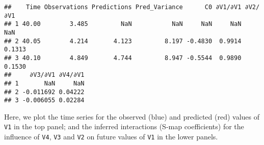 \documentclass[]{article}
\newenvironment{Shaded}{\begin{snugshade}}{\end{snugshade}}
\newcommand{\DataTypeTok}[1]{\textcolor[rgb]{0.13,0.29,0.53}{#1}}
\newcommand{\DecValTok}[1]{\textcolor[rgb]{0.00,0.00,0.81}{#1}}
\newcommand{\FloatTok}[1]{\textcolor[rgb]{0.00,0.00,0.81}{#1}}
\newcommand{\KeywordTok}[1]{\textcolor[rgb]{0.13,0.29,0.53}{\textbf{#1}}}
\newcommand{\NormalTok}[1]{#1}
\newcommand{\OperatorTok}[1]{\textcolor[rgb]{0.81,0.36,0.00}{\textbf{#1}}}
\newcommand{\StringTok}[1]{\textcolor[rgb]{0.31,0.60,0.02}{#1}}
\begin{document}
\begin{verbatim}
##    Time Observations Predictions Pred_Variance      C0 ∂V1/∂V1 ∂V2/∂V1
## 1 40.00        3.485         NaN           NaN     NaN     NaN     NaN
## 2 40.05        4.214       4.123         8.197 -0.4830  0.9914  0.1313
## 3 40.10        4.849       4.744         8.947 -0.5544  0.9890  0.1530
##     ∂V3/∂V1 ∂V4/∂V1
## 1       NaN     NaN
## 2 -0.011692 0.04222
## 3 -0.006055 0.02284
\end{verbatim}

Here, we plot the time series for the observed (blue) and predicted
(red) values of \texttt{V1} in the top panel; and the inferred
interactions (S-map coefficients) for the influence of \texttt{V4},
\texttt{V3} and \texttt{V2} on future values of \texttt{V1} in the lower
panels.

\begin{Shaded}
\end{Shaded}
\end{document}
